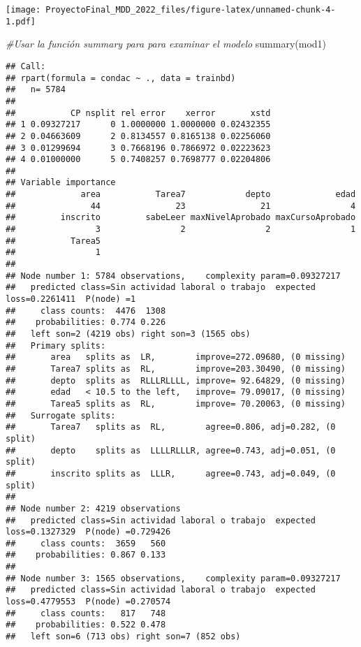 \documentclass[
]{article}
\newenvironment{Shaded}{\begin{snugshade}}{\end{snugshade}}
\newcommand{\CommentTok}[1]{\textcolor[rgb]{0.56,0.35,0.01}{\textit{#1}}}
\newcommand{\FunctionTok}[1]{\textcolor[rgb]{0.00,0.00,0.00}{#1}}
\newcommand{\NormalTok}[1]{#1}
\begin{document}
\texttt{[image: ProyectoFinal\_MDD\_2022\_files/figure-latex/unnamed-chunk-4-1.pdf]}

\begin{Shaded}
\begin{Highlighting}[]
\CommentTok{\#Usar la función summary para para examinar el modelo}
\FunctionTok{summary}\NormalTok{(mod1)}
\end{Highlighting}
\end{Shaded}

\begin{verbatim}
## Call:
## rpart(formula = condac ~ ., data = trainbd)
##   n= 5784 
## 
##           CP nsplit rel error    xerror       xstd
## 1 0.09327217      0 1.0000000 1.0000000 0.02432355
## 2 0.04663609      2 0.8134557 0.8165138 0.02256060
## 3 0.01299694      3 0.7668196 0.7866972 0.02223623
## 4 0.01000000      5 0.7408257 0.7698777 0.02204806
## 
## Variable importance
##             area           Tarea7            depto             edad 
##               44               23               21                4 
##         inscrito         sabeLeer maxNivelAprobado maxCursoAprobado 
##                3                2                2                1 
##           Tarea5 
##                1 
## 
## Node number 1: 5784 observations,    complexity param=0.09327217
##   predicted class=Sin actividad laboral o trabajo  expected loss=0.2261411  P(node) =1
##     class counts:  4476  1308
##    probabilities: 0.774 0.226 
##   left son=2 (4219 obs) right son=3 (1565 obs)
##   Primary splits:
##       area   splits as  LR,        improve=272.09680, (0 missing)
##       Tarea7 splits as  RL,        improve=203.30490, (0 missing)
##       depto  splits as  RLLLRLLLL, improve= 92.64829, (0 missing)
##       edad   < 10.5 to the left,   improve= 79.09017, (0 missing)
##       Tarea5 splits as  RL,        improve= 70.20063, (0 missing)
##   Surrogate splits:
##       Tarea7   splits as  RL,        agree=0.806, adj=0.282, (0 split)
##       depto    splits as  LLLLRLLLR, agree=0.743, adj=0.051, (0 split)
##       inscrito splits as  LLLR,      agree=0.743, adj=0.049, (0 split)
## 
## Node number 2: 4219 observations
##   predicted class=Sin actividad laboral o trabajo  expected loss=0.1327329  P(node) =0.729426
##     class counts:  3659   560
##    probabilities: 0.867 0.133 
## 
## Node number 3: 1565 observations,    complexity param=0.09327217
##   predicted class=Sin actividad laboral o trabajo  expected loss=0.4779553  P(node) =0.270574
##     class counts:   817   748
##    probabilities: 0.522 0.478 
##   left son=6 (713 obs) right son=7 (852 obs)

\end{verbatim}
\end{document}
